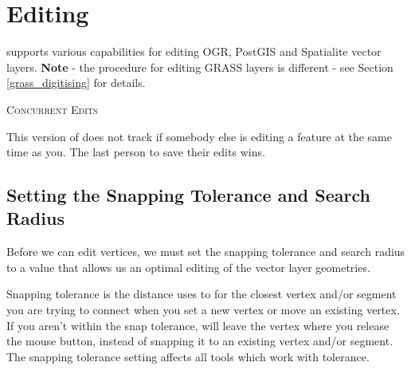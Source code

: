 \section{Editing}

\qg supports various capabilities for editing OGR, PostGIS and Spatialite
vector layers. \textbf{Note} - the procedure for editing GRASS layers is
different - see Section \ref{grass_digitising} for details.

\begin{Tip}\caption{\textsc{Concurrent Edits}}
This version of \qg does not track if somebody else is editing a
feature at the same time as you. The last person to save their edits wins.
\end{Tip}

\subsection{Setting the Snapping Tolerance and Search Radius}\label{snapping_tolerance}

Before we can edit vertices, we must set the snapping
tolerance and search radius to a value that allows us an optimal editing of
the vector layer geometries.


Snapping tolerance is the distance \qg uses to  for the
closest vertex and/or segment you are trying to
connect when you set a new vertex or move an existing vertex. If you aren't
within the snap tolerance, \qg will leave the vertex where you release the
mouse button, instead of snapping it to an existing vertex and/or segment.
The snapping tolerance setting affects all tools which work with tolerance.


